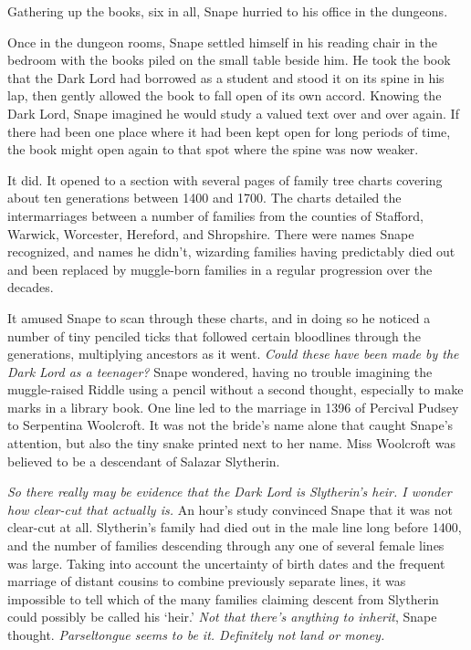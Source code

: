 \documentclass[a4paper,11pt]{article}
\begin{document}
Gathering up the books, six in all, Snape hurried to his office in the dungeons.

Once in the dungeon rooms, Snape settled himself in his reading chair in the bedroom with the books piled on the small table beside him. He took the book that the Dark Lord had borrowed as a student and stood it on its spine in his lap, then gently allowed the book to fall open of its own accord. Knowing the Dark Lord, Snape imagined he would study a valued text over and over again. If there had been one place where it had been kept open for long periods of time, the book might open again to that spot where the spine was now weaker.

It did. It opened to a section with several pages of family tree charts covering about ten generations between 1400 and 1700. The charts detailed the intermarriages between a number of families from the counties of Stafford, Warwick, Worcester, Hereford, and Shropshire. There were names Snape recognized, and names he didn't, wizarding families having predictably died out and been replaced by muggle-born families in a regular progression over the decades.

It amused Snape to scan through these charts, and in doing so he noticed a number of tiny penciled ticks that followed certain bloodlines through the generations, multiplying ancestors as it went. \emph{Could these have been made by the Dark Lord as a teenager?} Snape wondered, having no trouble imagining the muggle-raised Riddle using a pencil without a second thought, especially to make marks in a library book. One line led to the marriage in 1396 of Percival Pudsey to Serpentina Woolcroft. It was not the bride's name alone that caught Snape's attention, but also the tiny snake printed next to her name. Miss Woolcroft was believed to be a descendant of Salazar Slytherin.

\emph{So there really may be evidence that the Dark Lord is Slytherin's heir. I wonder how clear-cut that actually is.} An hour's study convinced Snape that it was not clear-cut at all. Slytherin's family had died out in the male line long before 1400, and the number of families descending through any one of several female lines was large. Taking into account the uncertainty of birth dates and the frequent marriage of distant cousins to combine previously separate lines, it was impossible to tell which of the many families claiming descent from Slytherin could possibly be called his `heir.' \emph{Not that there's anything to inherit}, Snape thought. \emph{Parseltongue seems to be it. Definitely not land or money.}
\end{document}
